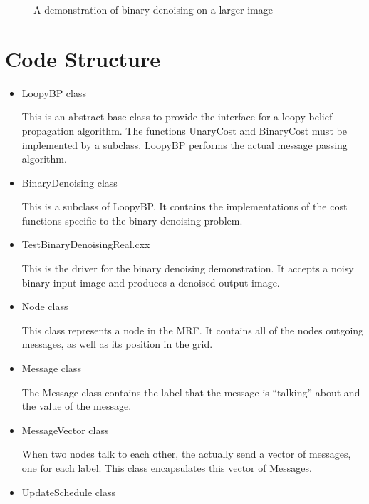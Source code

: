 \documentclass{InsightArticle}
\begin{document}
\begin{figure}[H]
\centering
{}
\caption{A demonstration of binary denoising on a larger image}
\label{fig:Rice}
\end{figure}

\section{Code Structure}
\begin{itemize}
\item LoopyBP class

This is an abstract base class to provide the interface for a loopy belief propagation algorithm. The functions UnaryCost and BinaryCost must be implemented by a subclass. LoopyBP performs the actual message passing algorithm.

\item BinaryDenoising class

This is a subclass of LoopyBP. It contains the implementations of the cost functions specific to the binary denoising problem.

\item TestBinaryDenoisingReal.cxx

This is the driver for the binary denoising demonstration. It accepts a noisy binary input image and produces a denoised output image.

\item Node class

This class represents a node in the MRF. It contains all of the nodes outgoing messages, as well as its position in the grid.

\item Message class

The Message class contains the label that the message is ``talking'' about and the value of the message.

\item MessageVector class

When two nodes talk to each other, the actually send a vector of messages, one for each label. This class encapsulates this vector of Messages.

\item UpdateSchedule class


\end{itemize}
\end{document}
